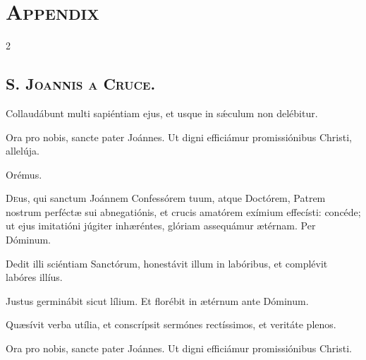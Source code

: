 \documentclass[9pt,twoside]{extarticle}
\begin{document}
\section*{\center \textsc{Appendix}\\ \large \textit{}}
\begin{multicols}{2} %
\subsection*{\center {}}
\subsubsection*{\center {}}
\subsection*{\center \textsc{S. Joannis a Cruce.}}

\begin{tightlist}{}
\item {} 
\item {} Collaudábunt multi sapiéntiam ejus, et usque in sǽculum non delébitur.
\item {} Ora pro nobis, sancte pater Joánnes.  Ut digni efficiámur promissiónibus Christi, allelúja.
\item Orémus. \hfill {}
\end{tightlist}
\lettrine{D}eus, qui sanctum Joánnem Confessórem tuum, atque Doctórem, Patrem nostrum perféctæ sui abnegatiónis, et crucis amatórem exímium effecísti: concéde; ut ejus imitatióni júgiter inhæréntes, glóriam assequámur ætérnam. Per Dóminum.

\begin{tightlist}{}
\item {} Dedit illi sciéntiam Sanctórum, honestávit illum in labóribus, et complévit labóres illíus.
\item {} Justus germinábit sicut lílium.  Et florébit in ætérnum ante Dóminum.
\item {} Quæsívit verba utília, et conscrípsit sermónes rectíssimos, et veritáte plenos.
\item {} Ora pro nobis, sancte pater Joánnes.  Ut digni efficiámur promissiónibus Christi.
\end{tightlist}


\end{multicols}
\end{document}
